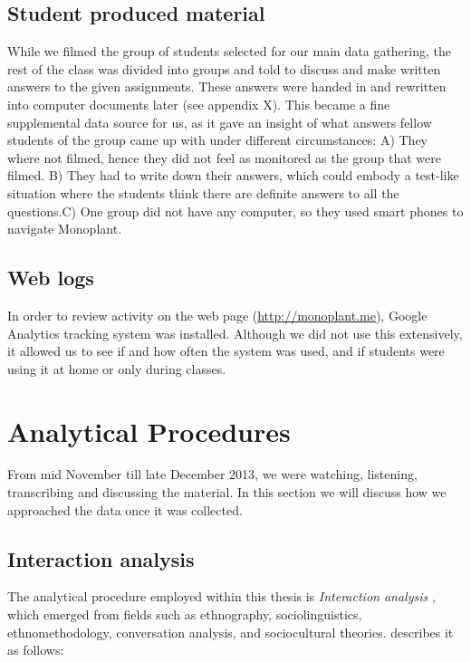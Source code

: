 \subsection{Student produced material}
While we filmed the group of students selected for our main data gathering, the rest of the class was divided into groups and told to discuss and make written answers to the given assignments. These answers were handed in and rewritten into computer documents later (see appendix X). This became a fine supplemental data source for us, as it gave an insight of what answers fellow students of the group came up with under different circumstances: A) They where not filmed, hence they did not feel as monitored as the group that were filmed. B) They had to write down their answers, which could embody a test-like situation where the students think there are definite answers to all the questions.C) One group did not have any computer, so they used smart phones to navigate Monoplant.


\subsection{Web logs}
In order to review activity on the web page (\url{http://monoplant.me}), Google Analytics tracking system was installed. Although we did not use this extensively, it allowed us to see if and how often the system was used, and if students were using it at home or only during classes. 

\section{Analytical Procedures}
From mid November till late December 2013, we were watching, listening, transcribing and discussing the material. In this section we will discuss how we approached the data once it was collected.
\subsection{Interaction analysis}
The analytical procedure employed within this thesis is \emph{Interaction analysis} \citep{jordan1995interaction}, which emerged from fields such as ethnography, sociolinguistics, ethnomethodology, conversation analysis, and sociocultural theories. \citeauthor{jordan1995interaction} describes it as follows:

